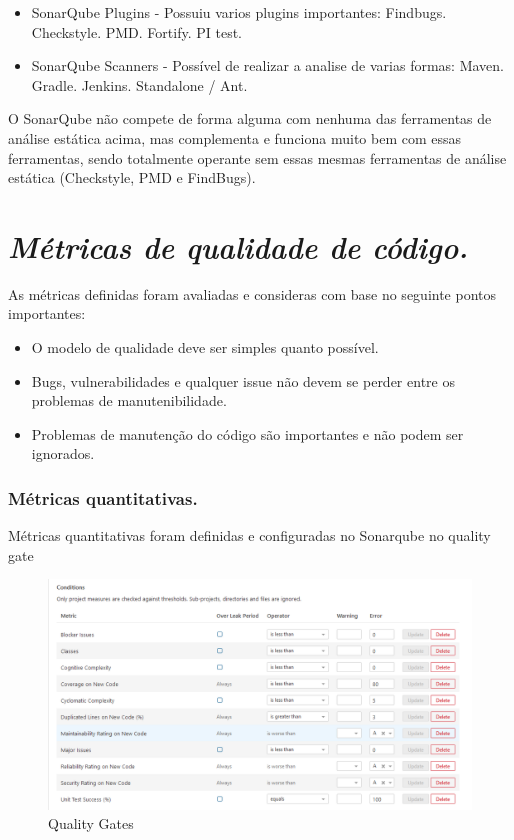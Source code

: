\documentclass[12pt]{article}
\begin{document}
\begin{itemize}
 \item SonarQube Plugins - Possuiu varios plugins importantes:
  \subitem Findbugs.
	\subitem Checkstyle.
	\subitem PMD.
	\subitem Fortify.
	\subitem PI test.
 \item SonarQube Scanners - Possível de realizar a analise de varias formas:
	\subitem Maven\cite{MAVEN}.
	\subitem Gradle\cite{GRADLE}.
	\subitem Jenkins\cite{JENKINS}.
	\subitem Standalone / Ant\cite{ANT}.
\end{itemize} 

O SonarQube não compete de forma alguma com nenhuma das ferramentas de análise estática acima, mas complementa e funciona muito bem com essas ferramentas, sendo totalmente operante sem essas mesmas ferramentas de análise estática (Checkstyle, PMD e FindBugs).

\section{\textit{Métricas de qualidade de código.}} \label{sec:managecodequality}

As métricas definidas foram avaliadas e consideras com base no seguinte pontos importantes:

 \begin{itemize}
 	\item O modelo de qualidade deve ser simples quanto possível.
 	\item Bugs, vulnerabilidades e qualquer issue não devem se perder entre os problemas de manutenibilidade.
 	\item Problemas de manutenção do código são importantes e não podem ser ignorados.
 \end{itemize}

\subsubsection{Métricas quantitativas.} \label{sec:sonar-planning-mquantity}

Métricas quantitativas foram definidas e configuradas no Sonarqube no quality gate \cite{SONAR_QUALITY_GATE}

\begin{figure}[h]
	\centering
		\includegraphics[scale=0.5]{img/sonar-quality-gates.png}
	\caption{Quality Gates}
	\label{fig:sonar-quality-gates}
\end{figure}
\end{document}

